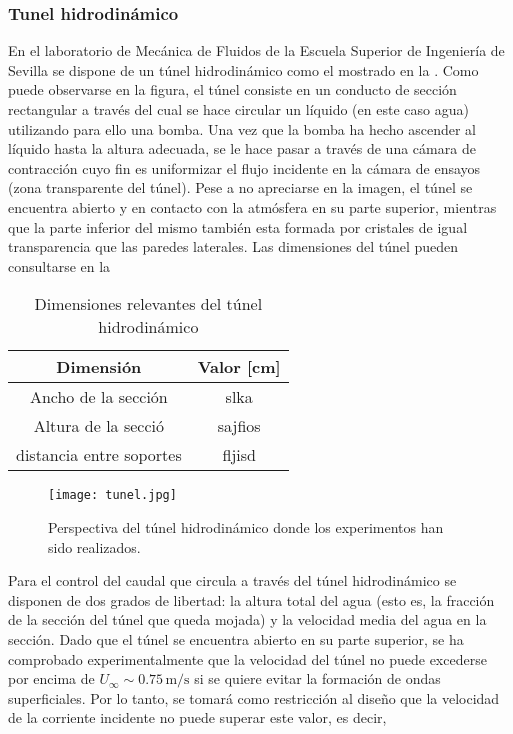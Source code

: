 \subsubsection*{Tunel hidrodinámico}

En el laboratorio de Mecánica de Fluidos de la Escuela Superior de Ingeniería de Sevilla se dispone de un túnel hidrodinámico como el mostrado en la . Como puede observarse en la figura, el túnel consiste en un conducto de sección rectangular a través del cual se hace circular un líquido (en este caso agua) utilizando para ello una bomba. Una vez que la bomba ha hecho ascender al líquido hasta la altura adecuada, se le hace pasar a través de una cámara de contracción cuyo fin es uniformizar el flujo incidente en la cámara de ensayos (zona transparente del túnel). Pese a no apreciarse en la imagen, el túnel se encuentra abierto  y en contacto con la atmósfera en su parte superior, mientras que la parte inferior del mismo también esta formada por cristales de igual transparencia que las paredes laterales. Las dimensiones del túnel pueden consultarse en la 

\begin{table}
\begin{tabular}{c c}
\textbf{Dimensión} & Valor [cm] \\
\hline \hline
Ancho de la sección & slka  \\
Altura de la secció & sajfios \\
distancia entre soportes & fljisd \\
\hline
\end{tabular}
\caption{Dimensiones relevantes del túnel hidrodinámico}
\end{table}

\begin{figure}
\texttt{[image: tunel.jpg]}
\caption{Perspectiva del túnel hidrodinámico donde los experimentos han sido realizados.}
\end{figure}

Para el control del caudal que circula a través del túnel hidrodinámico se disponen de dos grados de libertad: la altura total del agua (esto es, la fracción de la sección del túnel que queda mojada) y la velocidad media del agua en la sección. Dado que el túnel se encuentra abierto en su parte superior, se ha comprobado experimentalmente que la velocidad del túnel no puede excederse por encima de $U_{\infty} \sim 0.75\,\mathrm{m/s}$ si se quiere evitar la formación de ondas superficiales. Por lo tanto, se tomará como restricción al diseño que la velocidad de la corriente incidente no puede superar este valor, es decir,

